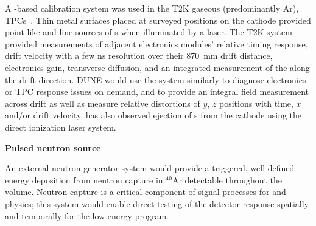 A \phel{}-based calibration system was used in the T2K gaseous (predominantly Ar), TPCs~\cite{Abgrall:2010hi}. 
Thin metal surfaces placed at surveyed positions on the cathode provided point-like and line sources of \phel{}s when illuminated by a laser. The T2K \phel system provided measurements 
of adjacent electronics modules' relative timing response, drift velocity with a few \si{\nano\s} resolution over their \SI{870}{\milli\m} drift distance, electronics gain, 
transverse diffusion, and an integrated measurement of the \efield along the drift direction. DUNE would use the system similarly to diagnose electronics or TPC response issues on demand, and to provide an integral field measurement across drift as well as measure relative distortions of $y$, $z$ positions with time, $x$ and/or drift velocity. \microboone has also observed ejection of \phel{}s from the cathode using the direct ionization laser system. 

\textbf{Pulsed neutron source} 

An external neutron generator system would provide a triggered, well defined energy deposition from neutron capture in $^{40}$Ar detectable throughout the  volume. Neutron capture is a critical component of signal processes for  and  physics; this system would enable direct testing of the detector response  spatially and temporally for the low-energy program. 

